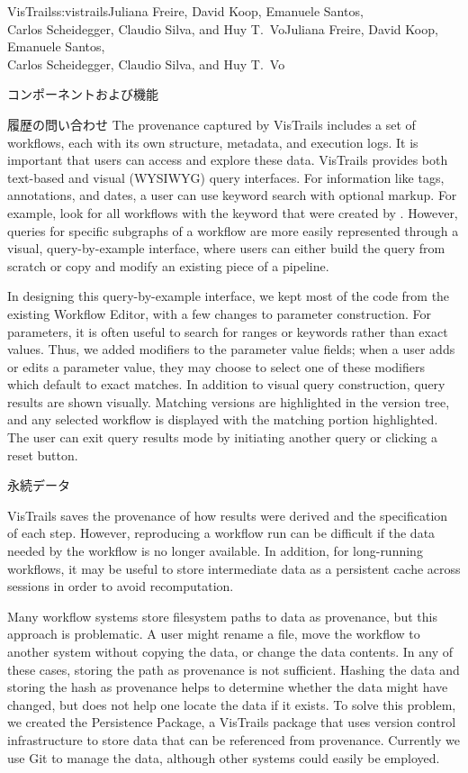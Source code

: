 \begin{aosachaptertoc}{VisTrails}{s:vistrails}{Juliana Freire, David Koop, Emanuele Santos, \\ Carlos Scheidegger, Claudio Silva, and Huy T.\ Vo}{Juliana Freire, David Koop, Emanuele Santos, \\ \hspace*{0.9cm} Carlos Scheidegger, Claudio Silva, and Huy T.\ Vo}
\begin{aosasect1}{コンポーネントおよび機能}
\begin{aosasect2}{履歴の問い合わせ}
The provenance captured by VisTrails includes a set of workflows, each
with its own structure, 
metadata, and execution logs. It is important that users can access
and explore these data.  VisTrails provides both text-based and visual
(WYSIWYG) query interfaces.  For information like tags, annotations,
and dates, a user can use keyword search with optional markup. For
example, look for all workflows with the keyword  that were
created by .  However, queries for specific subgraphs of
a workflow are more easily represented through a visual, query-by-example interface, where users can
either build the query from scratch or copy and modify an existing
piece of a pipeline.

In designing this query-by-example interface, we kept most of the code
from the existing Workflow Editor, with a few changes to parameter
construction.  For parameters, it is often useful to search for ranges
or keywords rather than exact values.  Thus, we added modifiers to the
parameter value fields; when a user adds or edits a parameter value,
they may choose to select one of these modifiers which default to
exact matches.  In addition to visual query construction, query
results are shown visually.  Matching versions are highlighted in the
version tree, and any selected workflow is displayed with the matching
portion highlighted.  The user can exit query results mode by
initiating another query or clicking a reset button.

\end{aosasect2}

\begin{aosasect2}{永続データ}

VisTrails saves the provenance of how results were derived and the
specification of each step. However, reproducing a workflow run can be
difficult if the data needed by the workflow is no longer available.
In addition, for long-running workflows, it may be useful to store
intermediate data as a persistent cache across sessions in order to
avoid recomputation.

Many workflow systems store filesystem paths to data as provenance,
but this approach is problematic.  A user might rename a file, move
the workflow to another system without copying the data, or change the
data contents.  In any of these cases, storing the path as provenance
is not sufficient.  Hashing the data and storing
the hash as provenance helps to determine whether the data might have
changed, but does not help one locate the data if it exists.  To solve
this problem, we created the Persistence Package, a VisTrails package
that uses version control infrastructure to store data that can be
referenced from provenance.  Currently we use Git to manage the data,
although other systems could easily be employed.


\end{aosasect2}
\end{aosasect1}
\end{aosachaptertoc}
